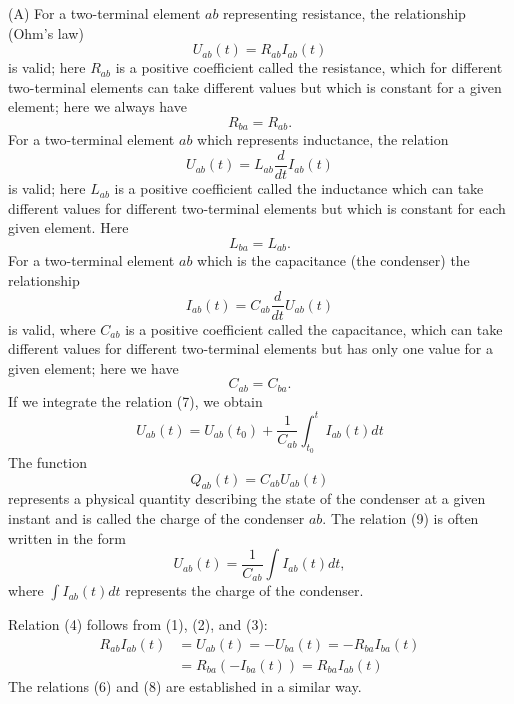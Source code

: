 \documentclass[10pt,a5paper]{book}
\theoremstyle{plain}
\theoremstyle{definition}
\theoremstyle{remark}
\begin{document}
(A) For a two-terminal element $a b$ representing resistance, the relationship (Ohm's law)
\begin{equation*}
U_{a b}(t)=R_{a b} I_{a b}(t) \tag{3}
\end{equation*}
is valid; here $R_{a b}$ is a positive coefficient called the resistance, which for different two-terminal elements can take different values but which is
constant for a given element; here we always have
\begin{equation*}
R_{b a}=R_{a b} . \tag{4}
\end{equation*}
For a two-terminal element $a b$ which represents inductance, the relation
\begin{equation*}
U_{a b}(t)=L_{a b} \frac{d}{d t} I_{a b}(t) \tag{5}
\end{equation*}
is valid; here $L_{a b}$ is a positive coefficient called the inductance which can take different values for different two-terminal elements but which is constant for each given element. Here
\begin{equation*}
L_{b a}=L_{a b} . \tag{6}
\end{equation*}
For a two-terminal element $a b$ which is the capacitance (the condenser) the relationship
\begin{equation*}
I_{a b}(t)=C_{a b} \frac{d}{d t} U_{a b}(t) \tag{7}
\end{equation*}
is valid, where $C_{a b}$ is a positive coefficient called the capacitance, which can take different values for different two-terminal elements but has only one value for a given element; here we have
\begin{equation*}
C_{a b}=C_{b a} . \tag{8}
\end{equation*}
If we integrate the relation (7), we obtain
\begin{equation*}
U_{a b}(t)=U_{a b}\left(t_{0}\right)+\frac{1}{C_{a b}} \int_{t_{0}}^{t} I_{a b}(t) d t \tag{9}
\end{equation*}
The function
\[
Q_{a b}(t)=C_{a b} U_{a b}(t)
\]
represents a physical quantity describing the state of the condenser at a given instant and is called the charge of the condenser $a b$. The relation (9) is often written in the form
\[
U_{a b}(t)=\frac{1}{C_{a b}} \int I_{a b}(t) d t,
\]
where $\int I_{a b}(t) d t$ represents the charge of the condenser.

Relation (4) follows from (1), (2), and (3):
\[
\begin{aligned}
R_{a b} I_{a b}(t) & =U_{a b}(t)=-U_{b a}(t)=-R_{b a} I_{b a}(t) \\
& =R_{b a}\left(-I_{b a}(t)\right)=R_{b a} I_{a b}(t)
\end{aligned}
\]
The relations (6) and (8) are established in a similar way.
\end{document}
